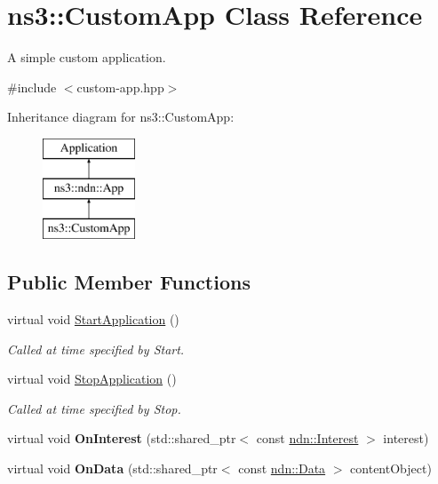 \hypertarget{classns3_1_1CustomApp}{}\section{ns3\+:\+:Custom\+App Class Reference}
\label{classns3_1_1CustomApp}


A simple custom application.  




{\ttfamily \#include $<$custom-\/app.\+hpp$>$}

Inheritance diagram for ns3\+:\+:Custom\+App\+:\begin{figure}[H]
\begin{center}
\leavevmode
\includegraphics[height=3.000000cm]{classns3_1_1CustomApp}
\end{center}
\end{figure}
\subsection*{Public Member Functions}
\begin{DoxyCompactItemize}
\item 
virtual void \hyperlink{classns3_1_1CustomApp_af291d1b66c7bb70c1c813b40500c4aab}{Start\+Application} ()\hypertarget{classns3_1_1CustomApp_af291d1b66c7bb70c1c813b40500c4aab}{}\label{classns3_1_1CustomApp_af291d1b66c7bb70c1c813b40500c4aab}

\begin{DoxyCompactList}\small\item\em Called at time specified by Start. \end{DoxyCompactList}\item 
virtual void \hyperlink{classns3_1_1CustomApp_a14de5dac3b272ab7381460b6170c24ed}{Stop\+Application} ()\hypertarget{classns3_1_1CustomApp_a14de5dac3b272ab7381460b6170c24ed}{}\label{classns3_1_1CustomApp_a14de5dac3b272ab7381460b6170c24ed}

\begin{DoxyCompactList}\small\item\em Called at time specified by Stop. \end{DoxyCompactList}\item 
virtual void {\bfseries On\+Interest} (std\+::shared\+\_\+ptr$<$ const \hyperlink{classndn_1_1Interest}{ndn\+::\+Interest} $>$ interest)\hypertarget{classns3_1_1CustomApp_a14f97a79b13c2ced59374de8408f9d7b}{}\label{classns3_1_1CustomApp_a14f97a79b13c2ced59374de8408f9d7b}

\item 
virtual void {\bfseries On\+Data} (std\+::shared\+\_\+ptr$<$ const \hyperlink{classndn_1_1Data}{ndn\+::\+Data} $>$ content\+Object)\hypertarget{classns3_1_1CustomApp_acb9f3bba075c7998bf5b149edafb109d}{}\label{classns3_1_1CustomApp_acb9f3bba075c7998bf5b149edafb109d}

\end{DoxyCompactItemize}
